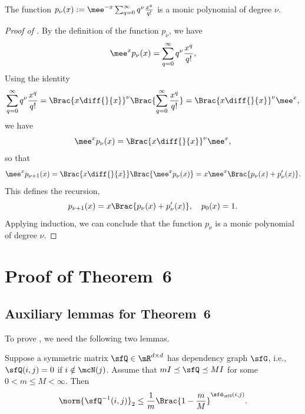 \documentclass[11pt]{article}
\begin{document}
\begin{lem}
\label{lem:pk}
The function
$p_\nu(x) := \mee^{-x} \sum_{q=0}^\infty q^\nu \frac{x^q}{q!}$ is a monic polynomial of degree $\nu$.
\end{lem}

\begin{proof}[Proof of ]
By the definition of the function $p_\nu$, we have 
\[
    \mee^x p_\nu(x) = \sum_{q=0}^\infty q^\nu \frac{x^q}{q!},
\] 
Using the identity  
\[
    \sum_{q=0}^\infty q^\nu \frac{x^q}{q!} = \Brac{ x \diff{}{x} }^\nu \Brac{ \sum_{q=0}^\infty \frac{x^q}{q!} } = \Brac{ x \diff{}{x} }^\nu \mee^x,
\]
we have 
\[
\mee^x p_\nu(x) =\Brac{ x \diff{}{x} }^\nu \mee^x,
\]
so that
\[
    \mee^x p_{\nu+1}(x) = \Brac{ x \diff{}{x} } \Brac{ \mee^x p_\nu(x) } = x \mee^x \Brac{ p_\nu(x) + p_\nu'(x) }.
\]
This defines the recursion,
\[
    p_{\nu+1}(x) = x \Brac{ p_\nu(x) + p_\nu'(x) }, \quad p_0(x) = 1.
\]
Applying induction, we can conclude that the function $p_\nu$ is a monic polynomial of degree $\nu$.
\end{proof}



\section{Proof of Theorem~6}
\label{app:LLIS}

\subsection{Auxiliary lemmas for Theorem~6}
\label{app:LLIS_lemmas}


To prove , we need the following two lemmas.

\begin{lem}
\label{lem:MatInvLoc}
Suppose a symmetric matrix $\sfQ \in \mR^{d\times d}$ has dependency graph $\sfG$, i.e., $\sfQ(i,j) = 0$ if $i \notin \mcN(j)$.
Assume that $m I \preceq \sfQ \preceq M I$ for some $0<m\le M <\infty$. Then 
\[
    \norm{ \sfQ^{-1}(i,j) }_2 \le \frac{1}{m} \Brac{ 1 - \frac{m}{M} }^{\sfd_\sfG(i,j)}. 
\]
\end{lem}
\end{document}
